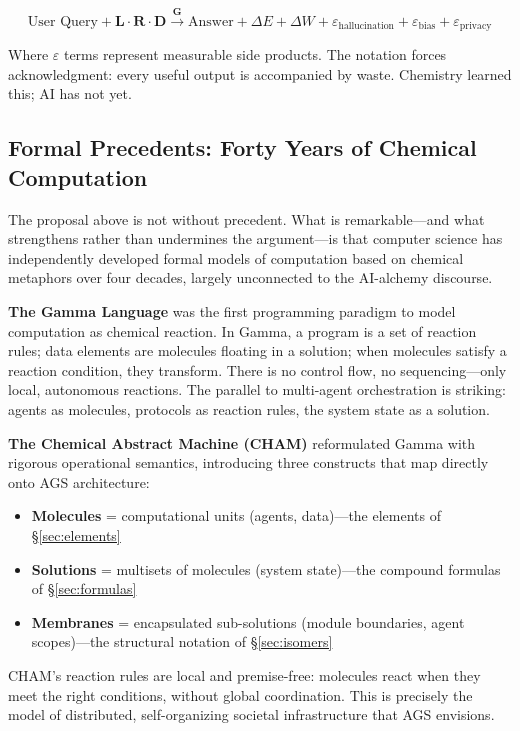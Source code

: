 \documentclass[12pt]{article}
\begin{document}
\[
\text{User Query} + \mathbf{L \cdot R \cdot D} \xrightarrow{\mathbf{G}} \text{Answer} + \Delta E + \Delta W + \varepsilon_{\text{hallucination}} + \varepsilon_{\text{bias}} + \varepsilon_{\text{privacy}}
\]

Where $\varepsilon$ terms represent measurable side products. The notation forces acknowledgment: every useful output is accompanied by waste. Chemistry learned this; AI has not yet.

\subsection{Formal Precedents: Forty Years of Chemical Computation}
\label{sec:precedents}

The proposal above is not without precedent. What is remarkable---and what strengthens rather than undermines the argument---is that computer science has independently developed formal models of computation based on chemical metaphors over four decades, largely unconnected to the AI-alchemy discourse.

\textbf{The Gamma Language} \citep{banatre1986} was the first programming paradigm to model computation as chemical reaction. In Gamma, a program is a set of reaction rules; data elements are molecules floating in a solution; when molecules satisfy a reaction condition, they transform. There is no control flow, no sequencing---only local, autonomous reactions. The parallel to multi-agent orchestration is striking: agents as molecules, protocols as reaction rules, the system state as a solution.

\textbf{The Chemical Abstract Machine (CHAM)} \citep{berry1992} reformulated Gamma with rigorous operational semantics, introducing three constructs that map directly onto AGS architecture:

\begin{itemize}
  \item \textbf{Molecules} = computational units (agents, data)---the elements of \S\ref{sec:elements}
  \item \textbf{Solutions} = multisets of molecules (system state)---the compound formulas of \S\ref{sec:formulas}
  \item \textbf{Membranes} = encapsulated sub-solutions (module boundaries, agent scopes)---the structural notation of \S\ref{sec:isomers}
\end{itemize}

CHAM's reaction rules are local and premise-free: molecules react when they meet the right conditions, without global coordination. This is precisely the model of distributed, self-organizing societal infrastructure that AGS envisions.
\end{document}
